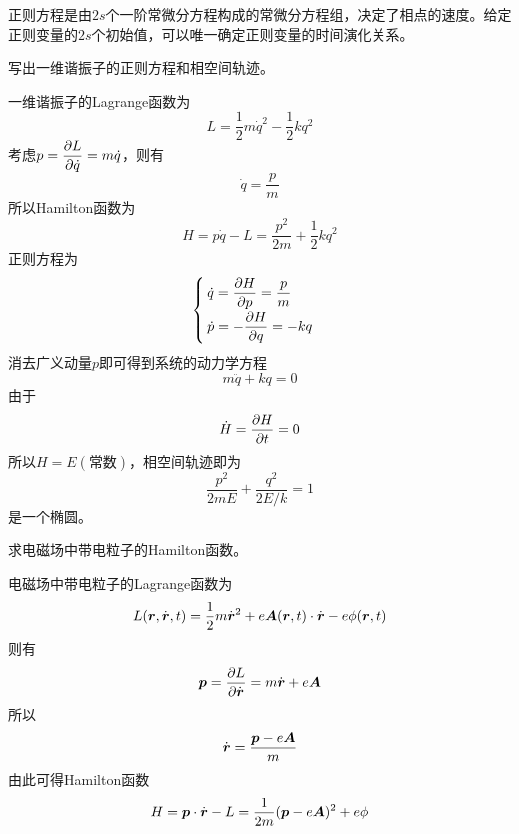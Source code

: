 正则方程是由$2s$个一阶常微分方程构成的常微分方程组，决定了相点的速度。给定正则变量的$2s$个初始值，可以唯一确定正则变量的时间演化关系。

\begin{example}[一维谐振子]
写出一维谐振子的正则方程和相空间轨迹。
\end{example}
\begin{solution}
一维谐振子的Lagrange函数为
\begin{equation*}
	L = \frac12 m\dot{q}^2 - \frac12 kq^2
\end{equation*}
考虑$p = \dfrac{\partial L}{\partial \dot{q}} = m\dot{q}$，则有
\begin{equation*}
	\dot{q} = \frac{p}{m}
\end{equation*}
所以Hamilton函数为
\begin{equation*}
	H = p\dot{q} - L = \frac{p^2}{2m} + \frac12 kq^2
\end{equation*}
正则方程为
\begin{equation*}
	\begin{cases}
		\dot{q} = \dfrac{\partial H}{\partial p} = \dfrac{p}{m} \\[1.5ex]
		\dot{p} = -\dfrac{\partial H}{\partial q} = -kq
	\end{cases}
\end{equation*}
消去广义动量$p$即可得到系统的动力学方程
\begin{equation*}
	m\ddot{q} + kq = 0
\end{equation*}
由于
\begin{equation*}
	\dot{H} = \frac{\partial H}{\partial t} = 0
\end{equation*}
所以$H = E(\text{常数})$，相空间轨迹即为
\begin{equation*}
	\frac{p^2}{2mE} + \frac{q^2}{2E/k} = 1
\end{equation*}
是一个椭圆。
\end{solution}

\begin{example}[电磁场中带电粒子的Hamilton函数]
求电磁场中带电粒子的Hamilton函数。
\end{example}
\begin{solution}
电磁场中带电粒子的Lagrange函数为
\begin{equation*}
	L(\boldsymbol{r},\dot{\boldsymbol{r}},t) = \frac12 m \dot{\boldsymbol{r}}^2 + e\boldsymbol{A}(\boldsymbol{r},t) \cdot \dot{\boldsymbol{r}} - e\phi(\boldsymbol{r},t)
\end{equation*}
则有
\begin{equation*}
	\boldsymbol{p} = \frac{\partial L}{\partial \dot{\boldsymbol{r}}} = m\dot{\boldsymbol{r}} + e\boldsymbol{A}
\end{equation*}
所以
\begin{equation*}
	\dot{\boldsymbol{r}} = \frac{\boldsymbol{p} - e\boldsymbol{A}}{m}
\end{equation*}
由此可得Hamilton函数
\begin{equation*}
	H = \boldsymbol{p} \cdot \dot{\boldsymbol{r}} - L = \frac{1}{2m} (\boldsymbol{p}-e\boldsymbol{A})^2 + e\phi
\end{equation*}
\end{solution}

